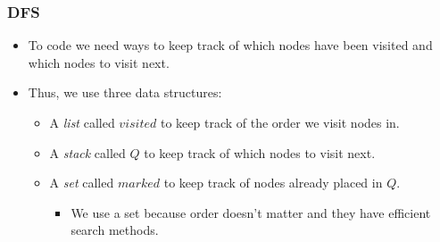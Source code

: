 \documentclass{beamer}
\begin{document}
\begin{frame}
\frametitle{DFS}
\begin{itemize}
\item To code we need ways to keep track of which nodes have been visited and which nodes to visit next.
\item Thus, we use three data structures:
	\begin{itemize}
	\item A \emph{list} called $visited$ to keep track of the order we visit nodes in.
	\item A \emph{stack} called $Q$ to keep track of which nodes to visit next.
	\item A \emph{set} called $marked$ to keep track of nodes already placed in $Q$.
		\begin{itemize}
		\item We use a set because order doesn't matter and they have efficient search methods.
		\end{itemize}
	\end{itemize}
\end{itemize}
\end{frame}
\end{document}

